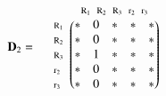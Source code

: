 \documentclass[a4paper,10pt]{article}
\begin{document}
\begin{equation*}
\mathbf{D}_2 = \; \; \; \; \; \begin{matrix}
 & 

\begin{matrix}
\text{\scriptsize $\mathrm{R}_1$} \!\!\! & 
\text{\scriptsize $\mathrm{R}_2$} \!\!\! & 
\text{\scriptsize $\mathrm{R}_3$} \!\!\! & 
\text{\scriptsize $\mathrm{r}_2$} \!\!\! & 
\text{\scriptsize $\mathrm{r}_3$}
\end{matrix}

\\ 

\begin{matrix*}[l]
\text{\scriptsize $\mathrm{R}_1$} \!\!\! \\
\text{\scriptsize $\mathrm{R}_2$} \!\!\! \\
\text{\scriptsize $\mathrm{R}_3$} \!\!\! \\
\text{\scriptsize $\mathrm{r}_2$} \!\!\! \\
\text{\scriptsize $\mathrm{r}_3$} \!\!\!
\end{matrix*}

& 

\begin{pmatrix}
* & 0 & * & * & * \\
* & 0 & * & * & * \\
* & 1 & * & * & * \\
* & 0 & * & * & * \\
* & 0 & * & * & *
\end{pmatrix}

\end{matrix}
\end{equation*}

\bigskip
\end{document}
